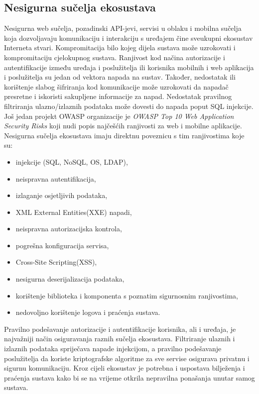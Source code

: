 \documentclass[times, utf8, diplomski]{fer}
\begin{document}
\subsection{Nesigurna sučelja ekosustava}
Nesigurna web sučelja, pozadinski API-jevi, servisi u oblaku i mobilna sučelja koja dozvoljavaju komunikaciju i interakciju s uređajem čine sveukupni ekosustav Interneta stvari. Kompromitacija bilo kojeg dijela sustava može uzrokovati i kompromitaciju cjelokupnog sustava. Ranjivost kod načina autorizacije i autentifikacije između uređaja i poslužitelja ili korisnika mobilnih i web aplikacija i poslužitelja su jedan od vektora napada na sustav. Također, nedostatak ili korištenje slabog šifriranja kod komunikacije može uzrokovati da napadač presretne i iskoristi sakupljene informacije za napad. Nedostatak pravilnog filtriranja ulazno/izlaznih podataka može dovesti do napada poput SQL injekcije. Još jedan projekt OWASP organizacije je \emph{OWASP Top 10 Web Application Security Risks} koji nudi popis najčešćih ranjivosti za web i mobilne aplikacije. Nesigurna sučelja ekosustava imaju direktnu poveznicu s tim ranjivostima koje su: \begin{itemize}
    \item injekcije (SQL, NoSQL, OS, LDAP),
    \item neispravna autentifikacija,
    \item izlaganje osjetljivih podataka,
    \item XML External Entities(XXE) napadi,
    \item neispravna autorizacijska kontrola,
    \item pogrešna konfiguracija servisa,
    \item Cross-Site Scripting(XSS),
    \item nesigurna deserijalizacija podataka,
    \item korištenje biblioteka i komponenta s poznatim sigurnosnim ranjivostima,
    \item nedovoljno korištenje logova i praćenja sustava.\citep{owasp2}
\end{itemize}

Pravilno podešavanje autorizacije i autentifikacije korisnika, ali i uređaja, je najvažniji način osiguravanja raznih sučelja ekosustava. Filtriranje ulaznih i izlaznih podataka spriječava napade injekcijom, a pravilno podešavanje poslužitelja da koriste kriptografske algoritme za sve servise osigurava privatnu i sigurnu komunikaciju. Kroz cijeli ekosustav je potrebna i uspostava bilježenja i praćenja sustava kako bi se na vrijeme otkrila nepravilna ponašanja unutar samog sustava.
\end{document}
